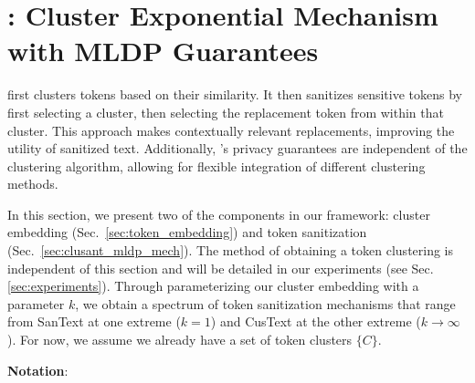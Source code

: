 
\section{\clusant: Cluster Exponential Mechanism with MLDP Guarantees}

\clusant first clusters tokens based on their similarity. It then sanitizes sensitive tokens by first selecting a cluster, then selecting the replacement token from within that cluster. This approach makes contextually relevant replacements, improving the utility of sanitized text. Additionally, \clusant's privacy guarantees are independent of the clustering algorithm, allowing for flexible integration of different clustering methods.

In this section, we present two of the components in our \clusant framework: cluster embedding (Sec.~\ref{sec:token_embedding}) and token sanitization (Sec.~\ref{sec:clusant_mldp_mech}). The method of obtaining a token clustering  is independent of this section and will be detailed in our experiments (see Sec. \ref{sec:experiments}). 
Through parameterizing our cluster embedding with a parameter $k$, we obtain a spectrum of token sanitization mechanisms that range from SanText at one extreme ($k = 1$) and CusText at the other extreme ($k \rightarrow \infty$).
For now, we assume we already have a set of token clusters $\{C\}$. 

\vspace{0.5em}

\noindent
\textbf{Notation}:

